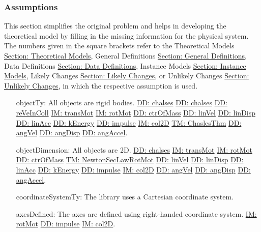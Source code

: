 \documentclass[12pt]{article}
\begin{document}
\subsubsection{Assumptions}
\label{Sec:Assumps}
This section simplifies the original problem and helps in developing the theoretical model by filling in the missing information for the physical system. The numbers given in the square brackets refer to the Theoretical Models \hyperref[Sec:TMs]{Section: Theoretical Models}, General Definitions \hyperref[Sec:GDs]{Section: General Definitions}, Data Definitions \hyperref[Sec:DDs]{Section: Data Definitions}, Instance Models \hyperref[Sec:IMs]{Section: Instance Models}, Likely Changes \hyperref[Sec:LCs]{Section: Likely Changes}, or Unlikely Changes \hyperref[Sec:UCs]{Section: Unlikely Changes}, in which the respective assumption is used.
\begin{itemize}
\item[objectTy:\phantomsection\label{assumpOT}]All objects are rigid bodies. \hyperref[DD:chalses]{DD: chalses} \hyperref[DD:chalses]{DD: chalses} \hyperref[DD:reVeInColl]{DD: reVeInColl} \hyperref[IM:transMot]{IM: transMot} \hyperref[IM:rotMot]{IM: rotMot} \hyperref[DD:ctrOfMass]{DD: ctrOfMass} \hyperref[DD:linVel]{DD: linVel} \hyperref[DD:linDisp]{DD: linDisp} \hyperref[DD:linAcc]{DD: linAcc} \hyperref[DD:kEnergy]{DD: kEnergy} \hyperref[DD:impulse]{DD: impulse} \hyperref[IM:col2D]{IM: col2D} \hyperref[TM:ChaslesThm]{TM: ChaslesThm} \hyperref[DD:angVel]{DD: angVel} \hyperref[DD:angDisp]{DD: angDisp} \hyperref[DD:angAccel]{DD: angAccel}.
\item[objectDimension:\phantomsection\label{assumpOD}]All objects are 2D. \hyperref[DD:chalses]{DD: chalses} \hyperref[IM:transMot]{IM: transMot} \hyperref[IM:rotMot]{IM: rotMot} \hyperref[DD:ctrOfMass]{DD: ctrOfMass} \hyperref[TM:NewtonSecLawRotMot]{TM: NewtonSecLawRotMot} \hyperref[DD:linVel]{DD: linVel} \hyperref[DD:linDisp]{DD: linDisp} \hyperref[DD:linAcc]{DD: linAcc} \hyperref[DD:kEnergy]{DD: kEnergy} \hyperref[DD:impulse]{DD: impulse} \hyperref[IM:col2D]{IM: col2D} \hyperref[DD:angVel]{DD: angVel} \hyperref[DD:angDisp]{DD: angDisp} \hyperref[DD:angAccel]{DD: angAccel}.
\item[coordinateSystemTy:\phantomsection\label{assumpCST}]The library uses a Cartesian coordinate system.
\item[axesDefined:\phantomsection\label{assumpAD}]The axes are defined using right-handed coordinate system. \hyperref[IM:rotMot]{IM: rotMot} \hyperref[DD:impulse]{DD: impulse} \hyperref[IM:col2D]{IM: col2D}.

\end{itemize}
\end{document}
